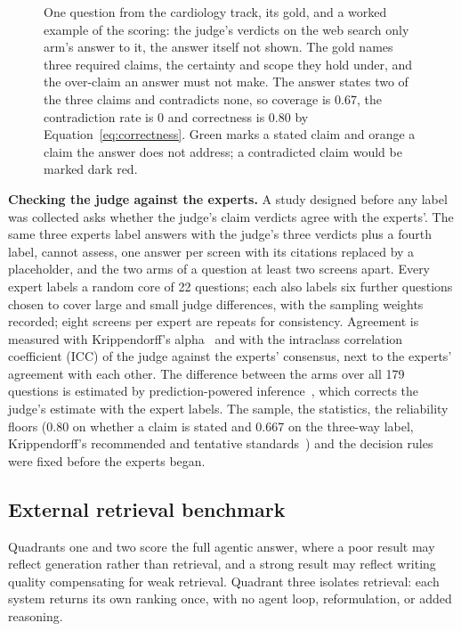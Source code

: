 \documentclass[sn-mathphys,Numbered]{sn-jnl}%
\newcommand{\lead}[1]{\textbf{#1}}   %
\begin{document}
\begin{figure}[htbp]
\begin{tikzpicture}[
  panel/.style={draw=RPDarkGrey, line width=0.6pt, text width=12.2cm, align=left,
    inner sep=9pt, font=\small, text=RPDarkGrey, anchor=north west},
]
\end{tikzpicture}
\caption{One question from the cardiology track, its gold, and a worked example of the
scoring: the judge's verdicts on the web search only arm's answer to it, the answer itself
not shown. The gold names three required claims, the certainty and scope
they hold under, and the over-claim an answer must not make. The answer states two of
the three claims and contradicts none, so coverage is 0.67, the contradiction rate is 0
and correctness is 0.80 by Equation~\ref{eq:correctness}. Green marks a stated claim and
orange a claim the answer does not address; a contradicted claim would be marked dark
red.}
\label{fig:q2-example}
\end{figure}

\lead{Checking the judge against the experts.} A study designed before any label was
collected asks whether the judge's claim verdicts agree with the experts'. The same three experts label answers
with the judge's three verdicts plus a fourth label, cannot assess, one answer per screen with its
citations replaced by a placeholder, and the two arms of a question at least two screens
apart. Every expert labels a random core of 22
questions; each also labels six further questions chosen to cover large and small
judge differences, with the sampling weights recorded; eight screens per expert are
repeats for consistency. Agreement is measured with Krippendorff's alpha~\cite{krippendorff} and with the intraclass correlation coefficient (ICC) of the judge
against the experts' consensus, next to the experts' agreement with each other. The
difference between the arms over all 179 questions is estimated by prediction-powered
inference~\cite{ppi,ppiplusplus}, which corrects the judge's
estimate with the expert labels. The sample, the statistics, the reliability floors
(0.80 on whether a claim is stated and 0.667 on the three-way label, Krippendorff's
recommended and tentative standards~\cite{krippendorff2004}) and the decision rules were fixed before the
experts began.

\subsection{External retrieval benchmark}\label{sec:method-quadrant-three}

Quadrants one and two score the full agentic answer, where a poor result
may reflect generation rather than retrieval, and a strong result may reflect writing
quality compensating for weak retrieval. Quadrant three isolates retrieval: each system returns its own ranking once, with no
agent loop, reformulation, or added reasoning.
\end{document}
